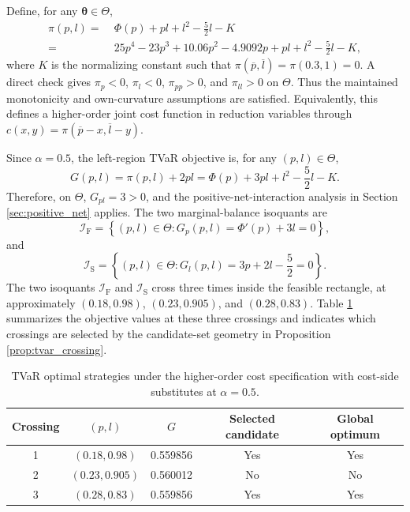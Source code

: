 \documentclass[a4paper,12pt]{article}
\begin{document}
Define, for any ${\bm\theta}\in\Theta$,
\begin{align*}
\pi\left(p,l\right)=&\;\Phi\left(p\right)+pl+l^2-\frac{5}{2}l-K\\=&\;25p^4-23p^3+10.06p^2-4.9092p+pl+l^2-\frac{5}{2}l-K,
\end{align*}
where $K$ is the normalizing constant such that $\pi\left(\overline{p},\overline{l}\right)=\pi\left(0.3,1\right)=0$. A direct check gives $\pi_p<0$, $\pi_l<0$, $\pi_{pp}>0$, and $\pi_{ll}>0$ on $\Theta$. Thus the maintained monotonicity and own-curvature assumptions are satisfied. Equivalently, this defines a higher-order joint cost function in reduction variables through \(c\left(x,y\right)=\pi\left(\overline{p}-x,\overline{l}-y\right)\).

Since $\alpha=0.5$, the left-region TVaR objective is, for any $\left(p,l\right)\in\Theta$,
\begin{equation*}
G\left(p,l\right)=\pi\left(p,l\right)+2pl=\Phi\left(p\right)+3pl+l^2-\frac{5}{2}l-K.
\end{equation*}
Therefore, on $\Theta$, $G_{pl}=3>0$, and the positive-net-interaction analysis in Section \ref{sec:positive_net} applies. The two marginal-balance isoquants are
\begin{equation*}
\mathcal{I}_{\text{F}}=\left\{\left(p,l\right)\in\Theta:G_p\left(p,l\right)=\Phi'\left(p\right)+3l=0\right\},
\end{equation*}
and
\begin{equation*}
\mathcal{I}_{\text{S}}=\left\{\left(p,l\right)\in\Theta:G_l\left(p,l\right)=3p+2l-\frac{5}{2}=0\right\}.
\end{equation*}
The two isoquants $\mathcal{I}_{\text{F}}$ and $\mathcal{I}_{\text{S}}$ cross three times inside the feasible rectangle, at approximately $\left(0.18,0.98\right)$, $\left(0.23,0.905\right)$, and $\left(0.28,0.83\right)$. Table \ref{tab:multiple_crossings_polynomial} summarizes the objective values at these three crossings and indicates which crossings are selected by the candidate-set geometry in Proposition \ref{prop:tvar_crossing}.
\begin{table}[htbp]
\centering
\begin{tabular}{c c c c c}
\hline
Crossing & \(\left(p,l\right)\) & \(G\) & Selected candidate & Global optimum\\
\hline
1 & $\left(0.18,0.98\right)$ & 0.559856 & Yes & Yes\\
2 & $\left(0.23,0.905\right)$ & 0.560012 & No & No\\
3 & $\left(0.28,0.83\right)$ & 0.559856 & Yes & Yes\\
\hline
\end{tabular}
\caption{TVaR optimal strategies under the higher-order cost specification with cost-side substitutes at $\alpha=0.5$.}
\label{tab:multiple_crossings_polynomial}
\end{table}
\end{document}
